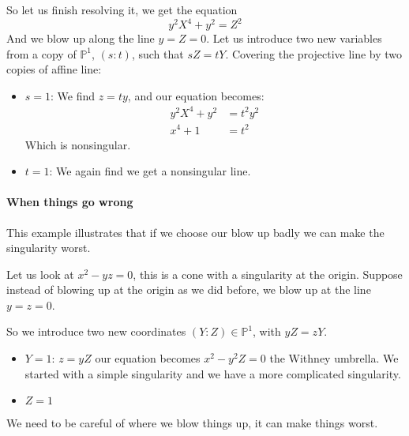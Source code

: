 \begin{example}
    So let us finish resolving it, we get the equation\[y^2X^4 +y^2 = Z^2\] And we blow up along the line $y=Z=0$. Let us introduce two new variables from a copy of $\mathbb{P}^1$, $(s\colon t)$, such that $sZ=tY$.
    Covering the projective line by two copies of affine line:\begin{itemize}
        \item $s=1$: We find $z=ty$, and our equation becomes:\begin{align*}
            y^2X^4+y^2 &= t^2y^2\\
            x^4+1&=t^2
        \end{align*} Which is nonsingular.
        \item $t=1$: We again find we get a nonsingular line.
    \end{itemize}        
\end{example}
\paragraph*{When things go wrong}
This example illustrates that if we choose our blow up badly we can make the singularity worst.
\begin{example}
    Let us look at $x^2-yz = 0$, this is a cone with a singularity at the origin. Suppose instead of blowing up at the origin as we did before, we blow up at the line $y=z=0$.
    
    So we introduce two new coordinates $(Y\colon Z)\in \mathbb{P}^1$, with $yZ=zY$.\begin{itemize}
        \item $Y=1$: $z=yZ$ our equation becomes $x^2-y^2Z=0$ the Withney umbrella. We started with a simple singularity and we have a more complicated singularity.
        \item $Z=1$
    \end{itemize}
    We need to be careful of where we blow things up, it can make things worst. 
\end{example}

